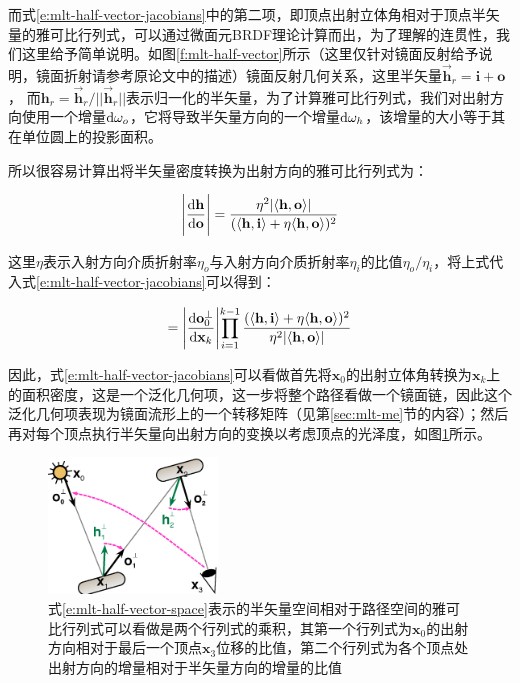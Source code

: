 而式\ref{e:mlt-half-vector-jacobians}中的第二项，即顶点出射立体角相对于顶点半矢量的雅可比行列式，可以通过微面元BRDF理论\cite{a:RobustMonteCarloMethodsforLightTransportSimulation}计算而出，为了理解的连贯性，我们这里给予简单说明。如图\ref{f:mlt-half-vector}所示（这里仅针对镜面反射给予说明，镜面折射请参考原论文中的描述）镜面反射几何关系，这里半矢量$\vec{\mathbf{h}}_r = \mathbf{i} + \mathbf{o}$， 而$\mathbf{h}_r = \vec{\mathbf{h}}_r / ||\vec{\mathbf{h}}_r||$表示归一化的半矢量，为了计算雅可比行列式，我们对出射方向使用一个增量${\rm d}\omega_o$，它将导致半矢量方向的一个增量${\rm d}\omega_h$，该增量的大小等于其在单位圆上的投影面积。

所以很容易计算出将半矢量密度转换为出射方向的雅可比行列式为：

\begin{equation}
	\Bigg|\frac{{\rm d}\mathbf{h}}{{\rm d}\mathbf{o}}\Bigg|=\frac{\eta^{2}|\langle\mathbf{h},\mathbf{o}\rangle|}{(\langle\mathbf{h},\mathbf{i}\rangle+\eta\langle\mathbf{h},\mathbf{o}\rangle)^{2}}
\end{equation}

这里$\eta$表示入射方向介质折射率$\eta_o$与入射方向介质折射率$\eta_i$的比值$\eta_o/\eta_i$，将上式代入式\ref{e:mlt-half-vector-jacobians}可以得到：

\begin{equation}\label{e:mlt-half-vector-space-jacobian}
	=\Biggl|\frac{{\rm d}\mathbf{o}^{\perp}_0}{{\rm d}\mathbf{x}_k}\Biggl|\prod^{k-1}_{i=1}\frac{(\langle\mathbf{h},\mathbf{i}\rangle+\eta\langle\mathbf{h},\mathbf{o}\rangle)^{2}}{\eta^{2}|\langle\mathbf{h},\mathbf{o}\rangle|}
\end{equation}

因此，式\ref{e:mlt-half-vector-jacobians}可以看做首先将$\mathbf{x}_0$的出射立体角转换为$\mathbf{x}_k$上的面积密度，这是一个泛化几何项，这一步将整个路径看做一个镜面链，因此这个泛化几何项表现为镜面流形上的一个转移矩阵（见第\ref{sec:mlt-me}节的内容）；然后再对每个顶点执行半矢量向出射方向的变换以考虑顶点的光泽度，如图\ref{f:mlt-half-vector-space-jacobians}所示。

\begin{figure}
	\sidecaption
	\includegraphics[width=0.4\textwidth]{figures/mlt/half-vector-space-jacobians}
	\caption{式\ref{e:mlt-half-vector-space}表示的半矢量空间相对于路径空间的雅可比行列式可以看做是两个行列式的乘积，其第一个行列式为$\mathbf{x}_0$的出射方向相对于最后一个顶点$\mathbf{x}_3$位移的比值，第二个行列式为各个顶点处出射方向的增量相对于半矢量方向的增量的比值}
	\label{f:mlt-half-vector-space-jacobians}
\end{figure}




